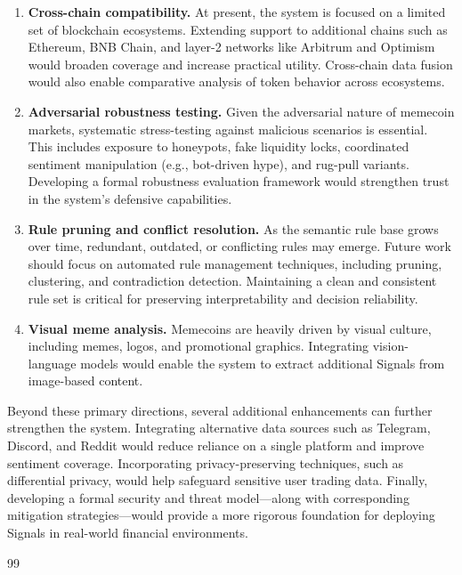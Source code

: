 \documentclass[12pt,a4paper,oneside,openany]{book}
\begin{document}
\begin{itemize}[leftmargin=8mm]
\begin{enumerate}[leftmargin=12mm]
\item \textbf{Cross-chain compatibility.}  
At present, the system is focused on a limited set of blockchain ecosystems. Extending support to additional chains such as Ethereum, BNB Chain, and layer-2 networks like Arbitrum and Optimism would broaden coverage and increase practical utility. Cross-chain data fusion would also enable comparative analysis of token behavior across ecosystems.

\item \textbf{Adversarial robustness testing.}  
Given the adversarial nature of memecoin markets, systematic stress-testing against malicious scenarios is essential. This includes exposure to honeypots, fake liquidity locks, coordinated sentiment manipulation (e.g., bot-driven hype), and rug-pull variants. Developing a formal robustness evaluation framework would strengthen trust in the system’s defensive capabilities.

\item \textbf{Rule pruning and conflict resolution.}  
As the semantic rule base grows over time, redundant, outdated, or conflicting rules may emerge. Future work should focus on automated rule management techniques, including pruning, clustering, and contradiction detection. Maintaining a clean and consistent rule set is critical for preserving interpretability and decision reliability.

\item \textbf{Visual meme analysis.}  
Memecoins are heavily driven by visual culture, including memes, logos, and promotional graphics. Integrating vision-language models would enable the system to extract additional Signals from image-based content.

\end{enumerate}

Beyond these primary directions, several additional enhancements can further strengthen the system. Integrating alternative data sources such as Telegram, Discord, and Reddit would reduce reliance on a single platform and improve sentiment coverage. Incorporating privacy-preserving techniques, such as differential privacy, would help safeguard sensitive user trading data. Finally, developing a formal security and threat model—along with corresponding mitigation strategies—would provide a more rigorous foundation for deploying Signals in real-world financial environments.
\clearpage
\thispagestyle{plain}
\renewcommand{\bibname}{\fontsize{18}{22}\selectfont\bfseries\hfill REFERENCES\hfill}
\begin{thebibliography}{99}


\end{thebibliography}
\end{itemize}
\end{document}

